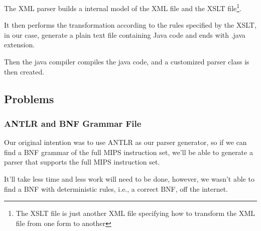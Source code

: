 The XML parser builds a internal model of the XML file and the XSLT 
file\footnote{The XSLT file is just another XML file specifying how
to transform the XML file from one form to another}.

It then performs the transformation according to the rules specified by
the XSLT, in our case, generate a plain text file containing Java code
and ends with .java extension.

Then the java compiler compiles the java code, and a customized parser
class is then created.

\subsection{Problems} \label{Problems encountered in parser}

\subsubsection{ANTLR and BNF Grammar File}

Our original intention was to use ANTLR as our parser generator,
so if we can find a BNF grammar of the full MIPS instruction set,
we'll be able to generate a parser that supports the full MIPS
instruction set.

It'll take less time and less work will need to be done, however,
we wasn't able to find a BNF with deterministic rules, i.e., a
correct BNF, off the internet.

